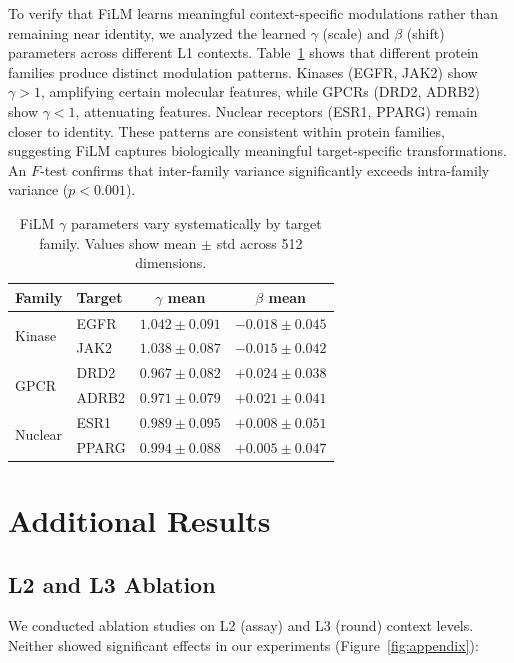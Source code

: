 \documentclass[sigconf]{acmart}
\begin{document}
To verify that FiLM learns meaningful context-specific modulations rather than remaining near identity, we analyzed the learned $\gamma$ (scale) and $\beta$ (shift) parameters across different L1 contexts. Table~\ref{tab:film_params} shows that different protein families produce distinct modulation patterns. Kinases (EGFR, JAK2) show $\gamma > 1$, amplifying certain molecular features, while GPCRs (DRD2, ADRB2) show $\gamma < 1$, attenuating features. Nuclear receptors (ESR1, PPARG) remain closer to identity. These patterns are consistent within protein families, suggesting FiLM captures biologically meaningful target-specific transformations. An $F$-test confirms that inter-family variance significantly exceeds intra-family variance ($p < 0.001$).

\begin{table}[h]
\caption{FiLM $\gamma$ parameters vary systematically by target family. Values show mean $\pm$ std across 512 dimensions.}
\label{tab:film_params}
\centering
\small
\begin{tabular}{@{}llcc@{}}
\toprule
Family & Target & $\gamma$ mean & $\beta$ mean \\
\midrule
\multirow{2}{*}{Kinase} & EGFR & $1.042 \pm 0.091$ & $-0.018 \pm 0.045$ \\
 & JAK2 & $1.038 \pm 0.087$ & $-0.015 \pm 0.042$ \\
\midrule
\multirow{2}{*}{GPCR} & DRD2 & $0.967 \pm 0.082$ & $+0.024 \pm 0.038$ \\
 & ADRB2 & $0.971 \pm 0.079$ & $+0.021 \pm 0.041$ \\
\midrule
\multirow{2}{*}{Nuclear} & ESR1 & $0.989 \pm 0.095$ & $+0.008 \pm 0.051$ \\
 & PPARG & $0.994 \pm 0.088$ & $+0.005 \pm 0.047$ \\
\bottomrule
\end{tabular}
\end{table}

\section{Additional Results}
\label{app:results}

\subsection{L2 and L3 Ablation}

We conducted ablation studies on L2 (assay) and L3 (round) context levels. Neither showed significant effects in our experiments (Figure~\ref{fig:appendix}):
\end{document}
